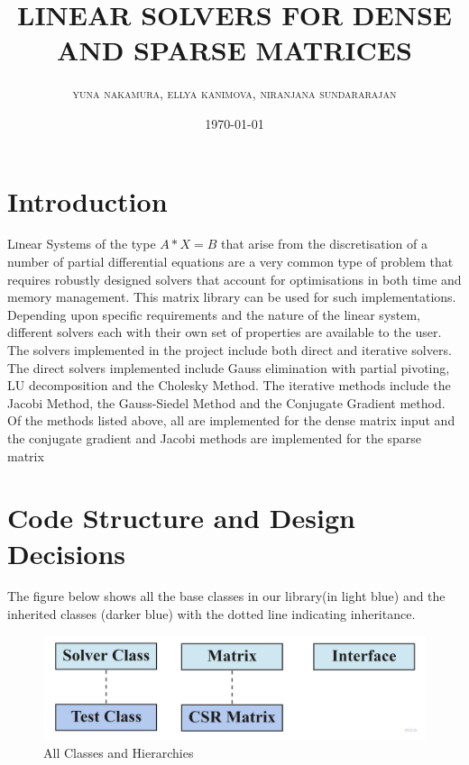 \documentclass[twoside,twocolumn]{article}
\title{LINEAR SOLVERS FOR DENSE AND SPARSE MATRICES} %
\author{%
\textsc{yuna nakamura},
\textsc{ellya kanimova},
\textsc{niranjana sundararajan}
}
\date{\today} %
\begin{document}
\maketitle


\section{Introduction}

\lettrine[nindent=1em,lines=2]{L}inear Systems of the type \(A*X = B\)  that arise from the discretisation of a number of partial differential equations are a very common type of problem that requires robustly designed solvers that account for optimisations in both time and memory management. This matrix library can be used for such  implementations. Depending upon specific requirements and the nature of the linear system, different solvers each with their own set of properties are available to the user.\\
The solvers implemented in the project include both direct and iterative solvers. The direct solvers implemented include Gauss elimination with partial pivoting, LU decomposition and the Cholesky Method. The iterative methods include the Jacobi Method, the Gauss-Siedel Method and the Conjugate Gradient method.\\
Of the methods listed above, all are implemented for the dense matrix input and the conjugate gradient and Jacobi methods are implemented for the sparse matrix

\section{Code Structure and Design Decisions}
The figure below shows all the base classes in our library(in light blue) and the inherited classes (darker blue) with the dotted line indicating inheritance.\\
\begin{figure}[h]
\centering
\includegraphics[height=2cm\textwidth]{images/Main Classes and Hierarchies.jpg}
\caption{All Classes and Hierarchies}
\end{figure}
\end{document}
